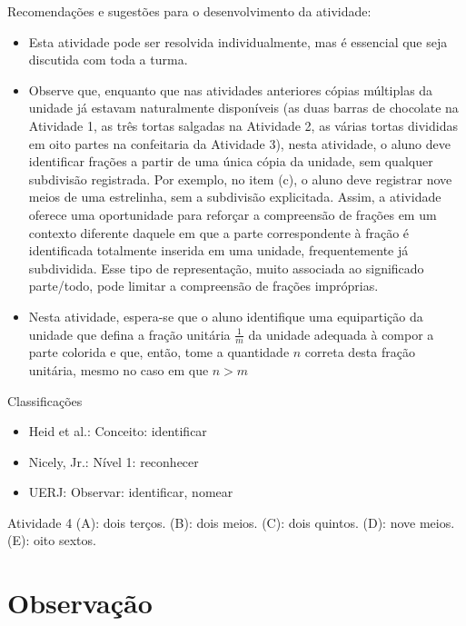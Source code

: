 \documentclass[oneside]{book}
\begin{document}
\begin{multicols}{2}
  Recomendações e sugestões para o desenvolvimento da atividade:
\begin{itemize} %
    \item       Esta atividade pode ser resolvida individualmente, mas é essencial que seja discutida com toda a turma.
    \item       Observe que, enquanto que nas atividades anteriores cópias múltiplas da unidade já estavam naturalmente disponíveis (as duas barras de chocolate na Atividade 1, as três tortas salgadas na Atividade 2, as várias tortas divididas em oito partes na confeitaria da Atividade 3), nesta atividade, o aluno deve identificar frações a partir de uma única cópia da unidade, sem qualquer subdivisão registrada. Por exemplo, no item (c), o aluno deve registrar nove meios de uma estrelinha, sem a subdivisão explicitada. Assim, a atividade oferece uma oportunidade para reforçar a compreensão de frações em um contexto diferente daquele em que a parte correspondente à fração é identificada totalmente inserida em uma unidade, frequentemente já subdividida. Esse tipo de representação, muito associada ao significado parte/todo, pode limitar a compreensão de frações impróprias.
    \item       Nesta atividade, espera-se que o aluno identifique uma equipartição da unidade que defina a fração unitária       $\frac{1}{m}$       da unidade adequada à compor a parte colorida e que, então, tome a quantidade       $n$       correta desta fração unitária, mesmo no caso em que       $n > m$
\end{itemize} %


  Classificações
\begin{itemize} %
    \item       Heid et al.: Conceito: identificar
    \item       Nicely, Jr.: Nível 1: reconhecer
    \item       UERJ: Observar: identificar, nomear
\end{itemize} %

\begin{resposta*}{Atividade 4}
  (A): dois terços.
  (B): dois meios.
  (C): dois quintos.
  (D): nove meios.
  (E): oito sextos.
\end{resposta*}



\section*{Observação}




\end{multicols}
\end{document}
